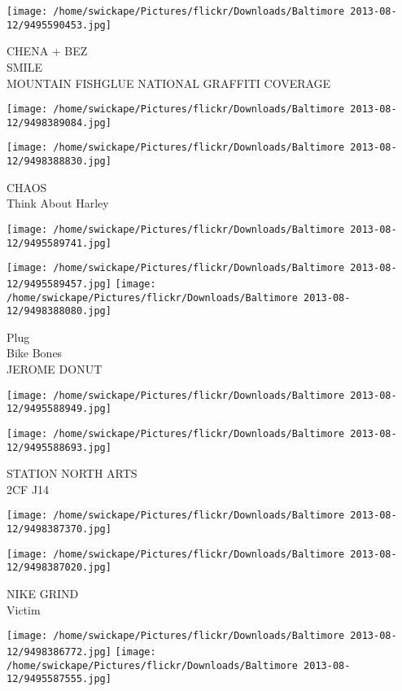 \documentclass[10pt,letterpaper]{article}
\begin{document}
\texttt{[image: /home/swickape/Pictures/flickr/Downloads/Baltimore 2013-08-12/9495590453.jpg]}

CHENA + BEZ\\
SMILE\\
MOUNTAIN FISHGLUE NATIONAL GRAFFITI COVERAGE
\pagebreak

\texttt{[image: /home/swickape/Pictures/flickr/Downloads/Baltimore 2013-08-12/9498389084.jpg]}

\vspace{0.25in}
\texttt{[image: /home/swickape/Pictures/flickr/Downloads/Baltimore 2013-08-12/9498388830.jpg]}

CHAOS\\
Think About Harley
\pagebreak

\texttt{[image: /home/swickape/Pictures/flickr/Downloads/Baltimore 2013-08-12/9495589741.jpg]}

\vspace{0.25in}
\texttt{[image: /home/swickape/Pictures/flickr/Downloads/Baltimore 2013-08-12/9495589457.jpg]}
\texttt{[image: /home/swickape/Pictures/flickr/Downloads/Baltimore 2013-08-12/9498388080.jpg]}

Plug\\
Bike Bones\\
JEROME DONUT
\pagebreak

\texttt{[image: /home/swickape/Pictures/flickr/Downloads/Baltimore 2013-08-12/9495588949.jpg]}

\vspace{0.25in}
\texttt{[image: /home/swickape/Pictures/flickr/Downloads/Baltimore 2013-08-12/9495588693.jpg]}

STATION NORTH ARTS\\
2CF J14
\pagebreak

\texttt{[image: /home/swickape/Pictures/flickr/Downloads/Baltimore 2013-08-12/9498387370.jpg]}

\vspace{0.25in}
\texttt{[image: /home/swickape/Pictures/flickr/Downloads/Baltimore 2013-08-12/9498387020.jpg]}

NIKE GRIND\\
Victim
\pagebreak

\texttt{[image: /home/swickape/Pictures/flickr/Downloads/Baltimore 2013-08-12/9498386772.jpg]}
\texttt{[image: /home/swickape/Pictures/flickr/Downloads/Baltimore 2013-08-12/9495587555.jpg]}
\end{document}
